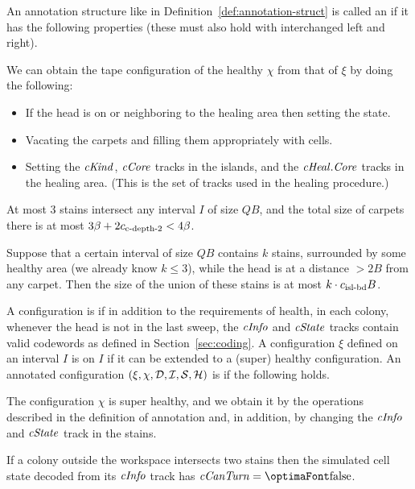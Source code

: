 \documentclass[12pt]{memoir}
\renewcommand{\le}{\leq}
\newcommand{\fld}[1]{\ensuremath{\textit{#1\/}}}
\def\B{B}
\newcommand{\cCanTurn}{\fld{cCanTurn}}
\newcommand{\Core}{\fld{Core}}
\newcommand{\cCore}{\fld{cCore}}
\newcommand{\cInfo}{\fld{cInfo}}
\newcommand{\cKind}{\fld{cKind}}
\newcommand{\cHeal}{\fld{cHeal}}
\newcommand{\cState}{\fld{cState}}
\newcommand{\cns}[1]{c_{\textrm{\upshape #1}}}
\newcommand{\cCDepth}[1]{\cns{c-depth-#1}}
\begin{document}
  \begin{definition}\label{def:annotated-config}
An annotation structure like in Definition~\ref{def:annotation-struct}
is called an  if it has the following properties
(these must also hold with interchanged left and right).

  \begin{alphenumIn}
   \item\label{i:annotated-config.health}
 We can obtain the tape configuration of the healthy \( \chi \) from that of
\( \xi \) by doing the following:
\begin{itemize}
\item If the head is on or neighboring to the healing area then setting the state.
\item Vacating the carpets and filling them appropriately with cells. 
\item Setting the \( \cKind \), \( \cCore \) tracks in the islands, and the
\( \cHeal.\Core \) tracks in the healing area.
(This is the set of tracks used in the healing  procedure.)
\end{itemize}

   \item \label{i:annotated-config.island-number}
    At most 3 stains intersect any interval \( I \) of size \( Q\B \),
and the total size of carpets there is at most \( 3\beta+ 2\cCDepth2<4\beta \).

\item\label{i:annotated-config.island-bounds} 
Suppose that a certain interval of size \( Q\B \) 
contains \( k \) stains, surrounded by some healthy area
(we already know \( k\le 3 \)), while the head is at a distance \( >2\B \) from any carpet.
Then the size of the union of these stains is at most \( k\cdot\cns{isl-bd}\B \).
 \end{alphenumIn}
\end{definition}


 \begin{definition}\label{def:super-healthy} 
A configuration is
 if in addition to the requirements of health, in each colony,
whenever the head is not in the last sweep, the \( \cInfo \) and \( \cState \)
tracks contain valid codewords as defined in Section~\ref{sec:coding}.
A configuration \( \xi \) defined on an interval \( I \) is 
on \( I \) if it can be extended to a (super) healthy configuration.
An annotated configuration \( (\xi,\chi, \mathcal{D}, \mathcal{I}, \mathcal{S}, \mathcal{H}) \)
is  if the following holds.
\begin{alphenumIn}
\item 
The configuration \( \chi \) is super healthy, 
and we obtain it by the operations described in the definition of annotation and, in addition, by
changing the \( \cInfo \) and \( \cState \) track in the stains.  
\item\label{i:super-annotated.two-stains}
 If a colony outside the workspace intersects two stains then the simulated cell state 
decoded from its \( \cInfo \) track has \( \cCanTurn=\false \).
\end{alphenumIn}
\end{definition}
\end{document}
